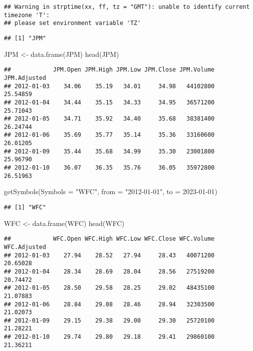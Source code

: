 \documentclass[
]{article}
\newenvironment{Shaded}{\begin{snugshade}}{\end{snugshade}}
\newcommand{\AttributeTok}[1]{\textcolor[rgb]{0.77,0.63,0.00}{#1}}
\newcommand{\FunctionTok}[1]{\textcolor[rgb]{0.00,0.00,0.00}{#1}}
\newcommand{\NormalTok}[1]{#1}
\newcommand{\OtherTok}[1]{\textcolor[rgb]{0.56,0.35,0.01}{#1}}
\newcommand{\StringTok}[1]{\textcolor[rgb]{0.31,0.60,0.02}{#1}}
\begin{document}
\begin{verbatim}
## Warning in strptime(xx, ff, tz = "GMT"): unable to identify current timezone 'T':
## please set environment variable 'TZ'
\end{verbatim}

\begin{verbatim}
## [1] "JPM"
\end{verbatim}

\begin{Shaded}
\begin{Highlighting}[]
\NormalTok{JPM }\OtherTok{\textless{}{-}} \FunctionTok{data.frame}\NormalTok{(JPM)}
\FunctionTok{head}\NormalTok{(JPM)}
\end{Highlighting}
\end{Shaded}

\begin{verbatim}
##            JPM.Open JPM.High JPM.Low JPM.Close JPM.Volume JPM.Adjusted
## 2012-01-03    34.06    35.19   34.01     34.98   44102800     25.54859
## 2012-01-04    34.44    35.15   34.33     34.95   36571200     25.71043
## 2012-01-05    34.71    35.92   34.40     35.68   38381400     26.24744
## 2012-01-06    35.69    35.77   35.14     35.36   33160600     26.01205
## 2012-01-09    35.44    35.68   34.99     35.30   23001800     25.96790
## 2012-01-10    36.07    36.35   35.76     36.05   35972800     26.51963
\end{verbatim}

\begin{Shaded}
\begin{Highlighting}[]
\FunctionTok{getSymbols}\NormalTok{(}\AttributeTok{Symbols =} \StringTok{"WFC"}\NormalTok{, }\AttributeTok{from =} \StringTok{"2012{-}01{-}01"}\NormalTok{, }\AttributeTok{to =} \StringTok{\textquotesingle{}2023{-}01{-}01\textquotesingle{}}\NormalTok{)}
\end{Highlighting}
\end{Shaded}

\begin{verbatim}
## [1] "WFC"
\end{verbatim}

\begin{Shaded}
\begin{Highlighting}[]
\NormalTok{WFC }\OtherTok{\textless{}{-}} \FunctionTok{data.frame}\NormalTok{(WFC)}
\FunctionTok{head}\NormalTok{(WFC)}
\end{Highlighting}
\end{Shaded}

\begin{verbatim}
##            WFC.Open WFC.High WFC.Low WFC.Close WFC.Volume WFC.Adjusted
## 2012-01-03    27.94    28.52   27.94     28.43   40071200     20.65028
## 2012-01-04    28.34    28.69   28.04     28.56   27519200     20.74472
## 2012-01-05    28.50    29.58   28.25     29.02   48435100     21.07883
## 2012-01-06    28.84    29.08   28.46     28.94   32303500     21.02073
## 2012-01-09    29.15    29.38   29.00     29.30   25720100     21.28221
## 2012-01-10    29.74    29.80   29.18     29.41   29860100     21.36211
\end{verbatim}
\end{document}
